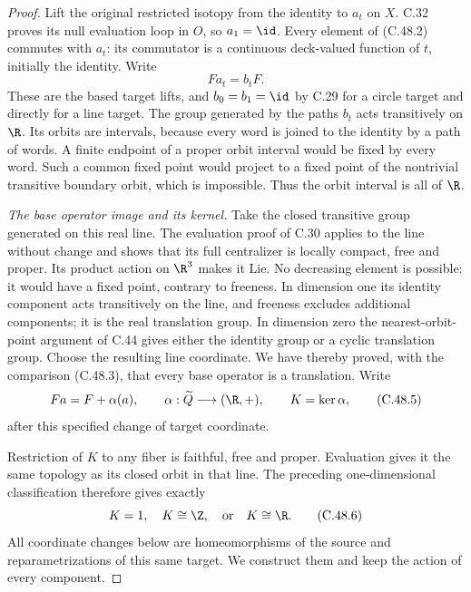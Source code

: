 \begin{proof}
Lift the original restricted isotopy from the identity
to $a_t$ on $X$. C.32 proves its null evaluation loop in
$O$, so $a_1=\id$. Every element of (C.48.2) commutes with
$a_t$: its commutator is a continuous deck-valued function
of $t$, initially the identity. Write
\[
                         Fa_t=b_tF.                    \tag{C.48.4}
\]
These are the based target lifts, and $b_0=b_1=\id$ by
C.29 for a circle target and directly for a line target.
The group generated by the paths $b_t$ acts transitively
on $\R$. Its orbits are intervals, because every word is
joined to the identity by a path of words. A finite
endpoint of a proper orbit interval would be fixed by
every word. Such a common fixed point would project to a
fixed point of the nontrivial transitive boundary orbit,
which is impossible. Thus the orbit interval is all of
$\R$.

\emph{The base operator image and its kernel.}
Take the closed transitive group generated on this real
line. The evaluation proof of C.30 applies to the line
without change and shows that its full centralizer is
locally compact, free and proper. Its product action on
$\R^3$ makes it Lie. No decreasing element is possible:
it would have a fixed point, contrary to freeness.
In dimension one its identity component acts transitively
on the line, and freeness excludes additional components;
it is the real translation group. In dimension zero the
nearest-orbit-point argument of C.44 gives either the
identity group or a cyclic translation group. Choose the
resulting line coordinate. We have thereby proved, with
the comparison (C.48.3), that every base operator is a
translation. Write
\[
 Fa=F+\alpha(a),\qquad
 \alpha:\widetilde Q\longrightarrow(\R,+),\qquad
 K=\ker\alpha,
                                                        \tag{C.48.5}
\]
after this specified change of target coordinate.

Restriction of $K$ to any fiber is faithful, free and
proper. Evaluation gives it the same topology as its
closed orbit in that line. The preceding one-dimensional
classification therefore gives exactly
\[
                         K=1,\quad K\cong\Z,
                         \quad\text{or}\quad K\cong\R.
                                                        \tag{C.48.6}
\]
All coordinate changes below are homeomorphisms of the
source and reparametrizations of this same target.
We construct them and keep the action of every component.


\end{proof}

